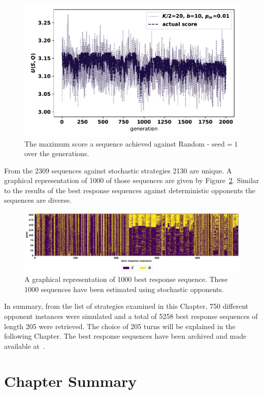 \begin{figure}[!htbp]
    \centering
    \includegraphics[width=.7\textwidth]{src/chapters/06/img/maximum_score_per_generation_random.pdf}
    \caption{The maximum score a sequence achieved against Random - seed\(=1\)
    over the generations.}\label{fig:random_ga_score}
\end{figure}

From the 2309 sequences against stochastic strategies 2130 are unique. A graphical representation of 1000 of
those sequences are given by Figure~\ref{fig:brs_visualisation_stochastic}.
Similar to the results of the best response sequences against deterministic
opponents the sequences are diverse.

\begin{figure}[!htbp]
    \centering
    \includegraphics[width=\textwidth]{src/chapters/06/img/stochastic_best_responses.pdf}
    \caption{A graphical representation of 1000 best response sequence. These
    1000 sequences have been estimated using stochastic opponents.}\label{fig:brs_visualisation_stochastic}
\end{figure}

In summary, from the list of \numberofstrategiesbestsequences strategies
examined in this Chapter, 750 different opponent instances were simulated and a
total of 5258 best response sequences of length 205 were retrieved. The choice of
205 turns will be explained in the following Chapter. The best response sequences have
been archived and made available at~\cite{Glynatsi2020_sequences}.

\section{Chapter Summary}


